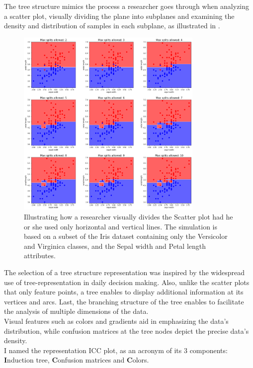 \documentclass[11pt]{article}
\begin{document}
The tree structure mimics the process a researcher goes through when analyzing a scatter plot, visually dividing the plane into subplanes and examining the density and distribution of samples in each subplane, as illustrated in .

\begin{figure}[H]
\centering
\includegraphics[width=0.8\textwidth]{scatter_plot_illustration.png}

\caption{Illustrating how a researcher visually divides the Scatter plot had he or she used only horizontal and vertical lines. The simulation is based on a subset of the Iris dataset containing only the Versicolor and Virginica classes, and the Sepal width and Petal length attributes.}
\label{fig:fig1}

\end{figure}

The selection of a tree structure representation was inspired by the widespread use of tree-representation in daily decision making. Also, unlike the scatter plots that only feature points, a tree enables to display additional information at its vertices and arcs. Last, the branching structure of the tree enables to facilitate the analysis of multiple dimensions of the data. \\
Visual features such as colors and gradients aid in emphasizing the data's distribution, while confusion matrices at the tree nodes depict the precise data's density. \\
I named the representation ICC plot, as an acronym of its 3 components: \textbf{I}nduction tree, \textbf{C}onfusion matrices and \textbf{C}olors.
\end{document}
